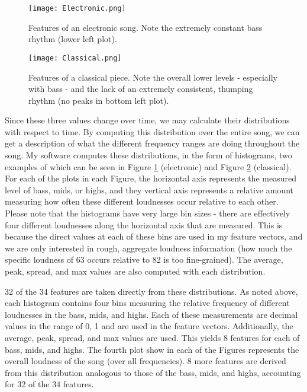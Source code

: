 \documentclass[aps,twocolumn,secnumarabic,balancelastpage,amsmath,amssymb,nofootinbib]{revtex4-1}
\begin{document}
\begin{figure}
\texttt{[image: Electronic.png]}
\caption{Features of an electronic song. Note the extremely constant bass rhythm (lower left plot).}
\label{fig:ElectronicDist}
\end{figure}

\begin{figure}
\texttt{[image: Classical.png]}
\caption{Features of a classical piece. Note the overall lower levels - especially with bass - and the lack of an extremely consistent, thumping rhythm (no peaks in bottom left plot).}
\label{fig:ClassicalDist}
\end{figure}

Since these three values change over time, we may calculate their distributions with respect to time. By computing this distribution over the entire song, we can get a description of what the different frequency ranges are doing throughout the song. My software computes these distributions, in the form of histograms, two examples of which can be seen in Figure \ref{fig:ElectronicDist} (electronic) and Figure \ref{fig:ClassicalDist} (classical). For each of the plots in each Figure, the horizontal axis represents the measured level of bass, mids, or highs, and they vertical axis represents a relative amount measuring how often these different loudnesses occur relative to each other. Please note that the histograms have very large bin sizes - there are effectively four different loudnesses along the horizontal axis that are measured. This is because the direct values at each of these bins are used in my feature vectors, and we are only interested in rough, aggregate loudness information (how much the specific loudness of 63 occurs relative to 82 is too fine-grained). The average, peak, spread, and max values are also computed with each distribution. 

32 of the 34 features are taken directly from these distributions. As noted above, each histogram contains four bins measuring the relative frequency of different loudnesses in the bass, mids, and highs. Each of these measurements are decimal values in the range of 0, 1 and are used in the feature vectors. Additionally, the average, peak, spread, and max values are used. This yields 8 features for each of bass, mids, and highs. The fourth plot show in each of the Figures represents the overall loudness of the song (over all frequencies). 8 more features are derived from this distribution analogous to those of the bass, mids, and highs, accounting for 32 of the 34 features.
\end{document}
